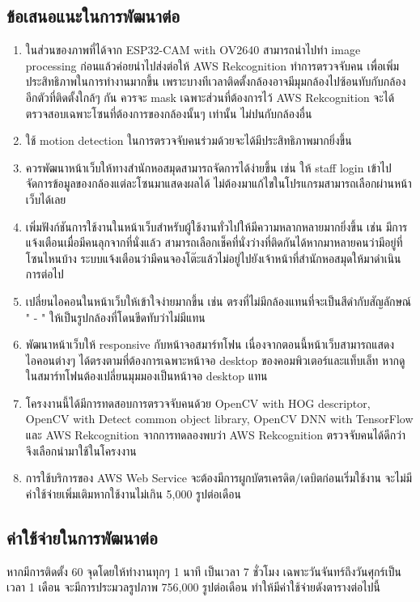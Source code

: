 \subsection{ข้อเสนอแนะในการพัฒนาต่อ}
\begin{enumerate}
    \item ในส่วนของภาพที่ได้จาก ESP32-CAM with OV2640 สามารถนำไปทำ image processing ก่อนแล้วค่อยนำไปส่งต่อให้ AWS Rekcognition ทำการตรวจจับคน เพื่อเพิ่มประสิทธิภาพในการทำงานมากขึ้น เพราะบางทีเวลาติดตั้งกล้องอาจมีมุมกล้องไปซ้อนทับกับกล้องอีกตัวที่ติดตั้งใกล้ๆ กัน
    ควรจะ mask เฉพาะส่วนที่ต้องการไว้ AWS Rekcognition จะได้ตรวจสอบเฉพาะโซนที่ต้องการของกล้องนั้นๆ เท่านั้น ไม่ปนกับกล้องอื่น
    \item ใช้ motion detection ในการตรวจจับคนร่วมด้วยจะได้มีประสิทธิภาพมากยิ่งขึ้น
    \item ควรพัฒนาหน้าเว็บให้ทางสำนักหอสมุดสามารถจัดการได้ง่ายขึ้น เช่น ให้ staff login เข้าไปจัดการข้อมูลของกล้องแต่ละโซนมาแสดงผลได้ ไม่ต้องมาแก้ไขในโปรแกรมสามารถเลือกผ่านหน้าเว็บได้เลย
    \item เพิ่มฟังก์ชันการใช้งานในหน้าเว็บสำหรับผู้ใช้งานทั่วไปให้มีความหลากหลายมากยิ่งขึ้น เช่น มีการแจ้งเตือนเมื่อมีคนลุกจากที่นั่งแล้ว สามารถเลือกเช็คที่นั่งว่างที่ติดกันได้หากมาหลายคนว่ามีอยู่ที่โซนไหนบ้าง ระบบแจ้งเตือนว่ามีคนจองโต๊ะแล้วไม่อยู่ไปยังเจ้าหน้าที่สำนักหอสมุดให้มาดำเนินการต่อไป
    \item เปลี่ยนไอคอนในหน้าเว็บให้เข้าใจง่ายมากขึ้น เช่น ตรงที่ไม่มีกล้องแทนที่จะเป็นสีดำกับสัญลักษณ์ " - " ให้เป็นรูปกล้องที่โดนขีดทับว่าไม่มีแทน 
    \item พัฒนาหน้าเว็บให้ responsive กับหน้าจอสมาร์ทโฟน เนื่องจากตอนนี้หน้าเว็บสามารถแสดงไอคอนต่างๆ ได้ตรงตามที่ต้องการเฉพาะหน้าจอ desktop ของคอมพิวเตอร์และแท็บเล็ท หากดูในสมาร์ทโฟนต้องเปลี่ยนมุมมองเป็นหน้าจอ desktop แทน
    \item โครงงานนี้ได้มีการทดสอบการตรวจจับคนด้วย OpenCV with HOG descriptor, OpenCV with Detect common object library, OpenCV DNN with TensorFlow และ AWS Rekcognition จากการทดลองพบว่า AWS Rekcognition ตรวจจับคนได้ดีกว่าจึงเลือกนำมาใช้ในโครงงาน
    \item การใช้บริการของ AWS Web Service จะต้องมีการผูกบัตรเครดิต/เดบิตก่อนเริ่มใช้งาน จะไม่มีค่าใช้จ่ายเพิ่มเติมหากใช้งานไม่เกิน 5,000 รูปต่อเดือน
\end{enumerate}

\subsection{ค่าใช้จ่ายในการพัฒนาต่อ}
หากมีการติดตั้ง 60 จุดโดยให้ทำงานทุกๆ 1 นาที เป็นเวลา 7 ชั่วโมง เฉพาะวันจันทร์ถึงวันศุกร์เป็นเวลา 1 เดือน จะมีการประมวลรูปภาพ 756,000 รูปต่อเดือน ทำให้มีค่าใช้จ่ายดังตารางต่อไปนี้

